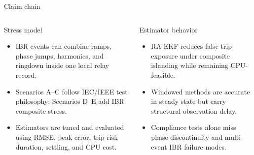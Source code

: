 \documentclass[aspectratio=169,10pt]{beamer}
\begin{document}
\begin{frame}{Claim chain}
\begin{center}
\end{center}
\vspace{0.25em}
\begin{columns}[T,onlytextwidth]
\begin{block}{Stress model}
\small
\begin{itemize}
  \item IBR events can combine ramps, phase jumps, harmonics, and ringdown inside one local relay record.
  \item Scenarios A--C follow IEC/IEEE test philosophy; Scenarios D--E add IBR composite stress.
  \item Estimators are tuned and evaluated using RMSE, peak error, trip-risk duration, settling, and CPU cost.
\end{itemize}
\end{block}
\begin{block}{Estimator behavior}
\small
\begin{itemize}
  \item RA-EKF reduces false-trip exposure under composite islanding while remaining CPU-feasible.
  \item Windowed methods are accurate in steady state but carry structural observation delay.
  \item Compliance tests alone miss phase-discontinuity and multi-event IBR failure modes.
\end{itemize}
\end{block}
\end{columns}
\end{frame}
\fi
\end{document}
